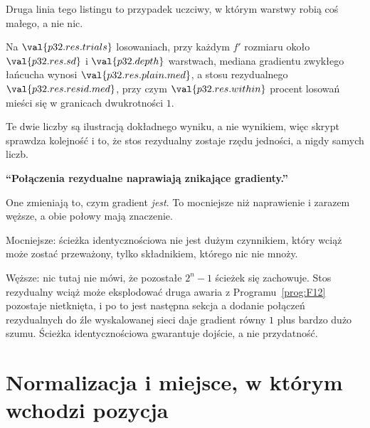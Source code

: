 
\begin{fr}
Druga linia tego listingu to przypadek uczciwy, w którym warstwy robią coś
małego, a nie nic.

Na $\val{p32.res.trials}$ losowaniach, przy każdym $f'$ rozmiaru około
$\val{p32.res.sd}$ i $\val{p32.depth}$ warstwach, mediana gradientu zwykłego
łańcucha wynosi $\val{p32.res.plain.med}$, a stosu rezydualnego
$\val{p32.res.resid.med}$, przy czym $\val{p32.res.within}$ procent losowań
mieści się w granicach dwukrotności $1$.

Te dwie liczby są ilustracją dokładnego wyniku, a nie wynikiem, więc skrypt
sprawdza kolejność i to, że stos rezydualny zostaje rzędu jedności, a nigdy
samych liczb.

\begin{trapbox}
\textbf{\enquote{Połączenia rezydualne naprawiają znikające gradienty.}}

One zmieniają to, czym gradient \emph{jest}. To mocniejsze niż naprawienie i
zarazem węższe, a obie połowy mają znaczenie.

Mocniejsze: ścieżka identycznościowa nie jest dużym czynnikiem, który wciąż
może zostać przeważony, tylko składnikiem, którego nic nie mnoży.

Węższe: nic tutaj nie mówi, że pozostałe $2^{n} - 1$ ścieżek się zachowuje.
Stos rezydualny wciąż może eksplodować \dash{} druga awaria z
Programu~\ref{prog:F12} pozostaje nietknięta, i po to jest następna sekcja
\dash{} a dodanie połączeń rezydualnych do źle wyskalowanej sieci daje
gradient równy $1$ plus bardzo dużo szumu. Ścieżka identycznościowa gwarantuje
dojście, a nie przydatność.
\end{trapbox}
\end{fr}


\section{Normalizacja i miejsce, w którym wchodzi pozycja}
\label{sec:P32-norm}

